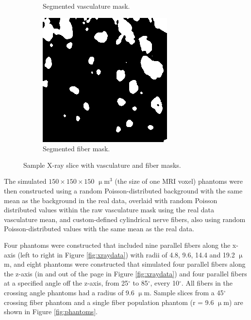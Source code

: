 \documentclass[11pt]{article}
\begin{document}
\begin{figure}[h]
\begin{subfigure}[b]{0.3\textwidth}
    \caption{Segmented vasculature mask.}
    \label{fig:vascmasc}
  \end{subfigure}
  \hspace{1em}
  \begin{subfigure}[b]{0.3\textwidth}
    \centering
    \includegraphics[width=0.9\linewidth]{figs/fibmask84}
    \caption{Segmented fiber mask.}
    \label{fig:fibmask}
  \end{subfigure}
  \caption{Sample X-ray slice with vasculature and fiber masks.}
  \label{fig:xrayslice}
\end{figure}

The simulated $150\times150\times150$ $\upmu$m$^3$ (the size of one MRI voxel)
phantoms were then constructed using a random Poisson-distributed background
with the same mean as the background in the real data, overlaid with random
Poisson distributed values within the raw vasculature mask using the real data
vasculature mean, and custom-defined cylindrical nerve fibers, also using random
Poisson-distributed values with the same mean as the real data.

Four phantoms were constructed that included nine parallel fibers along the
x-axis (left to right in Figure \ref{fig:xraydata}) with radii of 4.8, 9.6, 14.4
and 19.2 $\upmu$m, and eight phantoms were constructed that simulated four
parallel fibers along the z-axis (in and out of the page in Figure
\ref{fig:xraydata}) and four parallel fibers at a specified angle off the
z-axis, from 25$^{\circ}$ to 85$^{\circ}$, every 10$^{\circ}$. All fibers in the
crossing angle phantoms had a radius of 9.6 $\upmu$m. Sample slices from a
45$^{\circ}$ crossing fiber phantom and a single fiber population phantom (r =
9.6 $\upmu$m) are shown in Figure \ref{fig:phantoms}.
\end{document}
